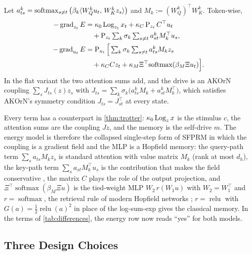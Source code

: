 \begin{proposition}
\label{prop:energy-gradient}
Let $a^k_{ts}=\operatorname{softmax}_{s\neq t}\big(\beta_k\langle W_Q^ku_t,\, W_K^kz_s\rangle\big)$ and
$M_k:=(W_Q^k)^\top W_K^k$. Token-wise,
\begin{align}
  -\operatorname{grad}_{z_t}E &= \kappa_0\operatorname{Log}_{z_t}x_t+\kappa_C\operatorname{P}_{z_t}C^\top u_t\nonumber\\
  &\quad+\operatorname{P}_{z_t}\textstyle\sum_k\sigma_k\sum_{s\neq t}a^k_{st}M_k^\top u_s,\label{eq:grad-z}\\
  -\operatorname{grad}_{u_t}E &= \operatorname{P}_{u_t}\Big[\textstyle\sum_k\sigma_k\sum_{s\neq t}a^k_{ts}M_kz_s\nonumber\\
  &\quad+\kappa_CCz_t+\kappa_M\Xi^\top\!\operatorname{softmax}(\beta_M\Xi u_t)\Big].\label{eq:grad-u}
\end{align}
In the flat variant the two attention sums add, and the drive is an AKOrN coupling $\sum_sJ_{ts}(z)z_s$
with $J_{ts}=\sum_k\sigma_k\big(a^k_{ts}M_k+a^k_{st}M_k^\top\big)$, which satisfies AKOrN's
symmetry condition $J_{ts}=J_{st}^\top$ at every state.
\end{proposition}

Every term has a counterpart in \cref{thm:trotter}: $\kappa_0\operatorname{Log}_zx$ is the stimulus $c$, the
attention sums are the coupling $Jz$, and the memory is the self-drive $m$. The energy model is
therefore the collapsed single-step form of SFPRM in which the coupling is a gradient field and the
MLP is a Hopfield memory: the query-path term $\sum_sa_{ts}M_kz_s$ is standard attention with value
matrix $M_k$ (rank at most $d_h$), the key-path term $\sum_sa_{st}M_k^\top u_s$ is the
contribution that makes the field conservative \citep{hoover2023et}, the matrix $C$ plays the role
of the output projection, and $\Xi^\top\operatorname{softmax}(\beta_M\Xi u)$ is the tied-weight MLP
$W_2\,r(W_1u)$ with $W_2=W_1^\top$ and $r=\operatorname{softmax}$, the retrieval rule of modern
Hopfield networks \citep{krotov2016dam,ramsauer2021hopfield}; $r=\operatorname{relu}$ with
$G(a)=\tfrac12\operatorname{relu}(a)^2$ in place of the log-sum-exp gives the classical memory.
In the terms of \cref{tab:differences}, the energy row now reads ``yes'' for both models.

\subsection{Three Design Choices}
\label{sec:energy-design}


